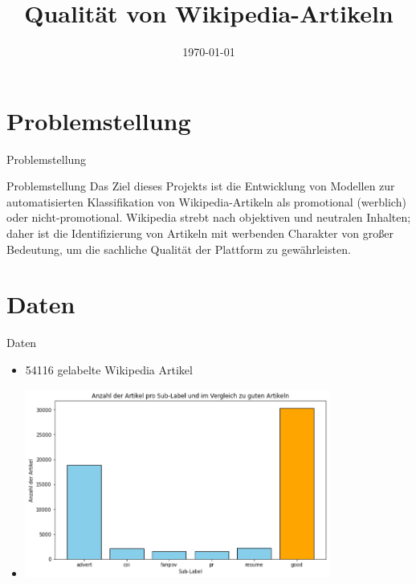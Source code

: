 \documentclass[aspectratio=169]{beamer} %
\title{Qualit\"at von Wikipedia-Artikeln}
\institute{Artificial Intelligence Group,\\
University of Hagen, Germany}
\date{\today}
\begin{document}




\begin{frame}
  \titlepage
\end{frame}
\nologo

\section{Problemstellung}

\begin{frame}{Problemstellung}
    \begin{block}{Problemstellung}
        Das Ziel dieses Projekts ist die Entwicklung von Modellen zur automatisierten Klassifikation von Wikipedia-Artikeln als promotional (werblich) oder nicht-promotional. Wikipedia strebt nach objektiven und neutralen Inhalten; daher ist die Identifizierung von Artikeln mit werbenden Charakter von gro\ss{}er Bedeutung, um die sachliche Qualit\"at der Plattform zu gew\"ahrleisten.
    \end{block}  
\end{frame}

\section{Daten}

\begin{frame}{Daten}
    \begin{itemize}
        \item 54116 gelabelte Wikipedia Artikel

        \item \includegraphics[width=10cm]{figures/distribution_multiple_classes.png}
    \end{itemize}
\end{frame}
\end{document}
